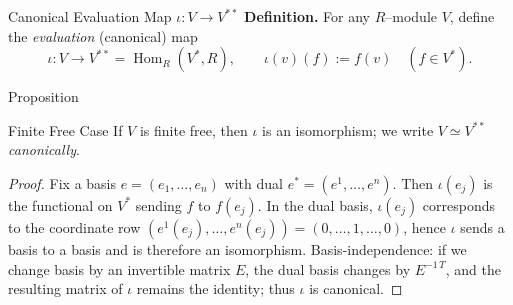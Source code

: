 \begin{frame}{Canonical Evaluation Map $\iota:V\to V^{**}$}
\textbf{Definition.} For any $R$–module $V$, define the \emph{evaluation} (canonical) map
\[
\iota:V\longrightarrow V^{**}=\operatorname{Hom}_R(V^*,R),\qquad
\iota(v)(f):=f(v)\quad (f\in V^*).
\]

\begin{center}
\end{center}

\end{frame}

\begin{frame}{Proposition}

\begin{block}{Finite Free Case} If $V$ is finite free, then $\iota$ is an isomorphism; we write $V \simeq V^{**}$ \emph{canonically}.
    
\end{block}

\begin{proof}
Fix a basis $e=(e_1,\dots,e_n)$ with dual $e^*=(e^1,\dots,e^n)$. Then $\iota(e_j)$ is the functional on $V^*$ sending $f$ to $f(e_j)$. In the dual basis, $\iota(e_j)$ corresponds to the coordinate row $(e^1(e_j),\dots,e^n(e_j))=(0,\dots,1,\dots,0)$, hence $\iota$ sends a basis to a basis and is therefore an isomorphism. Basis-independence: if we change basis by an invertible matrix $E$, the dual basis changes by $E^{-1\,T}$, and the resulting matrix of $\iota$ remains the identity; thus $\iota$ is canonical.
\end{proof}
\end{frame}


